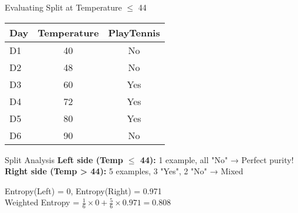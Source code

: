 \documentclass[usenames,dvipsnames]{beamer}
\begin{document}
    \begin{frame}{Evaluating Split at Temperature $\leq$ 44}
    \begin{table}[]
        \begin{tabular}{@{}lcc@{}}
            \toprule
            \textbf{Day} & \textbf{Temperature} & \textbf{PlayTennis} \\ \midrule
            D1           & 40                   & No                  \\
            \hline
            D2           & 48                   & No                  \\
            D3           & 60                   & Yes                 \\
            D4           & 72                   & Yes                 \\
            D5           & 80                   & Yes                 \\
            D6           & 90                   & No                  \\ \bottomrule
        \end{tabular}
    \end{table}

    \begin{examplebox}{Split Analysis}
    \textbf{Left side (Temp $\leq$ 44):} 1 example, all "No" → Perfect purity! \\
    \textbf{Right side (Temp > 44):} 5 examples, 3 "Yes", 2 "No" → Mixed

    Entropy(Left) = 0, Entropy(Right) = 0.971 \\
    Weighted Entropy = $\frac{1}{6} \times 0 + \frac{5}{6} \times 0.971 = 0.808$
    \end{examplebox}
    \end{frame}
\end{document}
